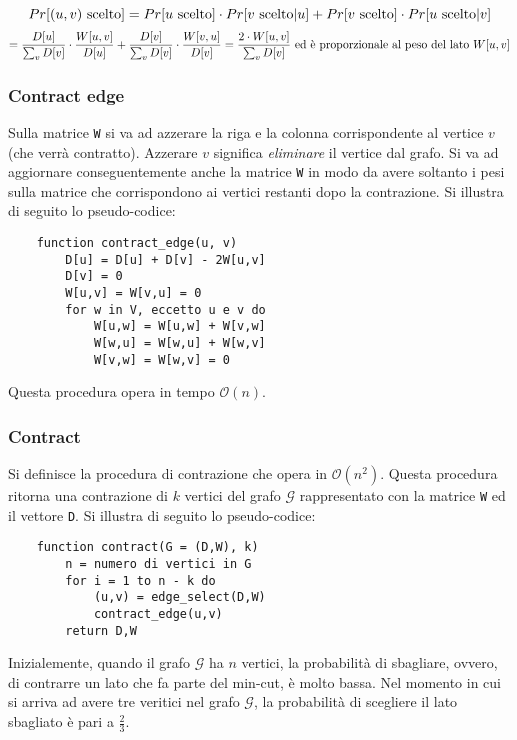\[
    Pr[(u,v) \textnormal{ scelto}] = Pr[u \textnormal{ scelto}] \cdot 
    Pr[v \textnormal{ scelto} | u] + Pr[v \textnormal{ scelto}] \cdot 
    Pr[u \textnormal{ scelto} | v]
\]
\[
    = \frac{D[u]}{\sum_v D[v]} \cdot \frac{W[u,v]}{D[u]} + \frac{D[v]}{\sum_v D[v]} 
    \cdot \frac{W[v,u]}{D[v]} =
    \frac{2 \cdot W[u,v]}{\sum_v D[v]} \textnormal{ ed è proporzionale al peso del lato } W[u,v]
\]

\subsubsection*{Contract edge}
Sulla matrice \verb|W| si va 
ad azzerare la riga e la colonna corrispondente al vertice $v$ (che verrà 
contratto). Azzerare $v$ significa \textit{eliminare} il vertice dal grafo. Si va 
ad aggiornare conseguentemente anche la matrice \verb|W| in modo da avere soltanto 
i pesi sulla matrice che corrispondono ai vertici restanti dopo la contrazione. 
Si illustra di seguito lo pseudo-codice:
\begin{verbatim}
    function contract_edge(u, v)
        D[u] = D[u] + D[v] - 2W[u,v]
        D[v] = 0
        W[u,v] = W[v,u] = 0
        for w in V, eccetto u e v do
            W[u,w] = W[u,w] + W[v,w]
            W[w,u] = W[w,u] + W[w,v]
            W[v,w] = W[w,v] = 0
\end{verbatim}
Questa procedura opera in tempo $\mathcal{O}(n)$.

\subsubsection*{Contract}
Si definisce la procedura di contrazione che opera in 
$\mathcal{O}(n^2)$. Questa procedura ritorna una contrazione di $k$ vertici del 
grafo $\mathcal{G}$ rappresentato con la matrice \verb|W| ed il vettore \verb|D|.
Si illustra di seguito lo pseudo-codice:
\begin{verbatim}
    function contract(G = (D,W), k)
        n = numero di vertici in G
        for i = 1 to n - k do
            (u,v) = edge_select(D,W)
            contract_edge(u,v)
        return D,W
\end{verbatim}
Inizialemente, quando il grafo $\mathcal{G}$ ha $n$ vertici, la probabilità di 
sbagliare, ovvero, di contrarre un lato che fa parte del min-cut, è molto bassa. 
Nel momento in cui si arriva ad avere tre veritici nel grafo $\mathcal{G}$, la 
probabilità di scegliere il lato sbagliato è pari a $\frac{2}{3}$.

